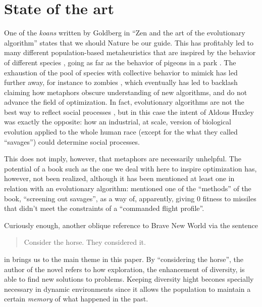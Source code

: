 \section{State of the art}


One of the {\em koans} written by Goldberg in ``Zen and the art of the
evolutionary algorithm'' states that we should Nature be our guide. This has
profitably led to many different population-based metaheuristics that are
inspired by the behavior of different species \cite{nedjah2020inspiration}, going as far as the behavior of
pigeons in a park \cite{blanco2019urban}. The exhaustion of the pool of
species with collective behavior to mimick has led further away, for instance to
zombies \cite{nguyen2012zombie}, which eventually has led to backlash
\cite{metaphor_exposed} claiming how metaphors obscure understanding of new
algorithms, and do not advance the field of optimization. In fact, evolutionary
algorithms are not the best way to reflect social processes
\cite{chattoe1998just}, but in this case the intent of Aldous Huxley was exactly
the opposite: how an industrial, at scale, version of biological evolution
applied to the whole human race (except for the what they called ``savages'')
could determine social processes.

This does not imply, however, that metaphors are necessarily
unhelpful. The potential of a book such as the one we deal with here to inspire
optimization has, however, not been realized, although it has been
mentioned at least one in relation with an evolutionary algorithm:
\cite{wollam1999reverse} mentioned one of the ``methods'' of the book,
``screening out savages'', as a way of, apparently, giving 0 fitness
to missiles that didn't meet the constraints of a ``commanded flight
profile''.

Curiously enough, another oblique reference to Brave New World via the
sentence
\begin{quote}
  Consider the horse. They considered it.
  \end{quote}
in \cite{DBLP:journals/corr/abs-2107-00314} brings us to the main
theme in this paper. By ``considering the horse'', the author of the
novel refers to how exploration, the enhancement of diversity, is able
to find new solutions to problems. Keeping diversity hight becones specially
necessary in dynamic environments \cite{cruz2011optimization} since it allows
the population to maintain a certain {\em memory} of what happened in the past.

